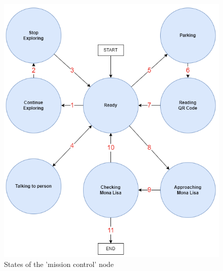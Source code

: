 \documentclass[a4paper,
  twoside, %
  headlines=2.1 %
  ]{scrartcl}
\begin{document}
\begin{figure}[H]
  \centering
  \includegraphics[scale=1.0]{mission_control.png}
  \caption{States of the 'mission control' node}   
\end{figure}
\end{document}
